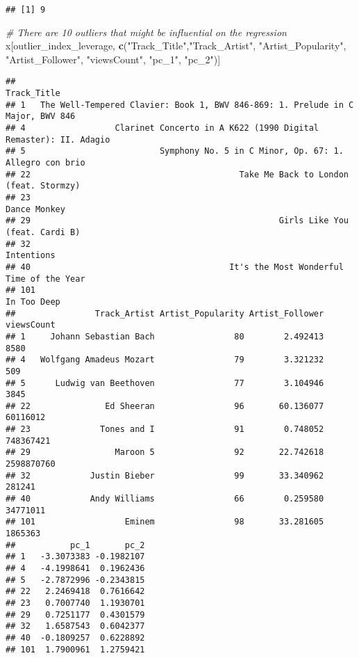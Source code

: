 \documentclass[
]{article}
\newenvironment{Shaded}{\begin{snugshade}}{\end{snugshade}}
\newcommand{\CommentTok}[1]{\textcolor[rgb]{0.56,0.35,0.01}{\textit{#1}}}
\newcommand{\KeywordTok}[1]{\textcolor[rgb]{0.13,0.29,0.53}{\textbf{#1}}}
\newcommand{\NormalTok}[1]{#1}
\newcommand{\StringTok}[1]{\textcolor[rgb]{0.31,0.60,0.02}{#1}}
\begin{document}
\begin{verbatim}
## [1] 9
\end{verbatim}

\begin{Shaded}
\begin{Highlighting}[]
\CommentTok{# There are 10 outliers that might be influential on the regression}
\NormalTok{x[outlier_index_leverage, }\KeywordTok{c}\NormalTok{(}\StringTok{"Track_Title"}\NormalTok{,}\StringTok{"Track_Artist"}\NormalTok{, }\StringTok{"Artist_Popularity"}\NormalTok{, }\StringTok{"Artist_Follower"}\NormalTok{, }\StringTok{"viewsCount"}\NormalTok{, }\StringTok{"pc_1"}\NormalTok{,}
                            \StringTok{"pc_2"}\NormalTok{)]}
\end{Highlighting}
\end{Shaded}

\begin{verbatim}
##                                                                        Track_Title
## 1   The Well-Tempered Clavier: Book 1, BWV 846-869: 1. Prelude in C Major, BWV 846
## 4                  Clarinet Concerto in A K622 (1990 Digital Remaster): II. Adagio
## 5                           Symphony No. 5 in C Minor, Op. 67: 1. Allegro con brio
## 22                                          Take Me Back to London (feat. Stormzy)
## 23                                                                    Dance Monkey
## 29                                                  Girls Like You (feat. Cardi B)
## 32                                                                      Intentions
## 40                                        It's the Most Wonderful Time of the Year
## 101                                                                    In Too Deep
##                Track_Artist Artist_Popularity Artist_Follower viewsCount
## 1     Johann Sebastian Bach                80        2.492413       8580
## 4   Wolfgang Amadeus Mozart                79        3.321232        509
## 5      Ludwig van Beethoven                77        3.104946       3845
## 22               Ed Sheeran                96       60.136077   60116012
## 23              Tones and I                91        0.748052  748367421
## 29                 Maroon 5                92       22.742618 2598870760
## 32            Justin Bieber                99       33.340962     281241
## 40            Andy Williams                66        0.259580   34771011
## 101                  Eminem                98       33.281605    1865363
##           pc_1       pc_2
## 1   -3.3073383 -0.1982107
## 4   -4.1998641  0.1962436
## 5   -2.7872996 -0.2343815
## 22   2.2469418  0.7616642
## 23   0.7007740  1.1930701
## 29   0.7251177  0.4301579
## 32   1.6587543  0.6042377
## 40  -0.1809257  0.6228892
## 101  1.7900961  1.2759421
\end{verbatim}
\end{document}

